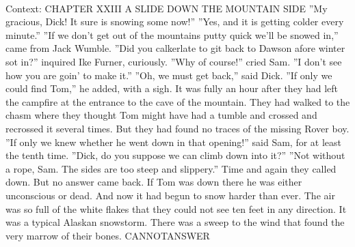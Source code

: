 \documentclass[11pt,a4paper, onecolumn]{article}
\begin{document}
\\ Context: CHAPTER XXIII A SLIDE DOWN THE MOUNTAIN SIDE ''My gracious, Dick! It sure is snowing some now!'' ''Yes, and it is getting colder every minute.'' ''If we don't get out of the mountains putty quick we'll be snowed in,'' came from Jack Wumble. ''Did you calkerlate to git back to Dawson afore winter sot in?'' inquired Ike Furner, curiously. ''Why of course!'' cried Sam. ''I don't see how you are goin' to make it.'' ''Oh, we must get back,'' said Dick. ''If only we could find Tom,'' he added, with a sigh. It was fully an hour after they had left the campfire at the entrance to the cave of the mountain. They had walked to the chasm where they thought Tom might have had a tumble and crossed and recrossed it several times. But they had found no traces of the missing Rover boy. ''If only we knew whether he went down in that opening!'' said Sam, for at least the tenth time. ''Dick, do you suppose we can climb down into it?'' ''Not without a rope, Sam. The sides are too steep and slippery.'' Time and again they called down. But no answer came back. If Tom was down there he was either unconscious or dead. And now it had begun to snow harder than ever. The air was so full of the white flakes that they could not see ten feet in any direction. It was a typical Alaskan snowstorm. There was a sweep to the wind that found the very marrow of their bones. CANNOTANSWER
\end{document}
